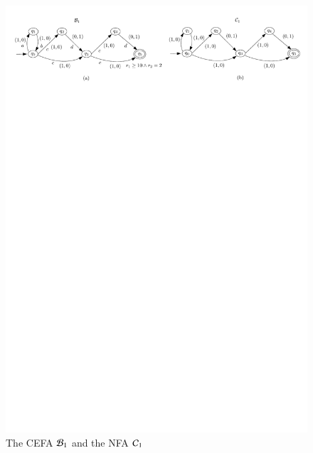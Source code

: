 {\begin{example}
\begin{figure}[htbp]
\includegraphics[scale = 0.65]{2024-5-13/sections/model-gen-exmp.pdf}
\caption{The CEFA $\mathcal{B}_1$ and the NFA $\mathcal{C}_1$}
\label{fig-model-gen-opt}
\end{figure}
\end{example}
}

